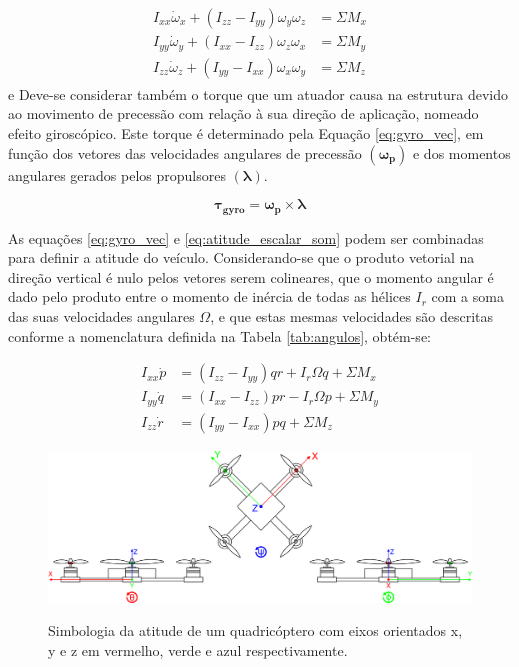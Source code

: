 \documentclass[main.tex]{subfiles}
\begin{document}
\begin{align}\label{eq:revisao_coriolis_escalar}
    \begin{split}
        I_{xx}\dot{\omega}_{x} + (I_{zz} - I_{yy})\omega_y\omega_z &= \Sigma M_x\\
        I_{yy}\dot{\omega}_{y} + (I_{xx} - I_{zz})\omega_z\omega_x &= \Sigma M_y\\
        I_{zz}\dot{\omega}_{z} + (I_{yy} - I_{xx})\omega_x\omega_y &= \Sigma M_z
    \end{split}
\end{align}
e
Deve-se considerar também o torque que um atuador causa na estrutura devido ao movimento de precessão com relação à sua direção de aplicação, nomeado efeito giroscópico. Este torque é determinado pela Equação \ref{eq:gyro_vec}, em função dos vetores das velocidades angulares de precessão $(\boldsymbol{\omega_p})$ e dos momentos angulares gerados pelos propulsores $(\boldsymbol{\lambda})$.

\begin{equation}\label{eq:gyro_vec}
    \boldsymbol{\tau_{gyro}} = \boldsymbol{\omega_p}\times\boldsymbol{\lambda}
\end{equation}

As equações \ref{eq:gyro_vec} e \ref{eq:atitude_escalar_som} podem ser combinadas para definir a atitude do veículo. Considerando-se que o produto vetorial na direção vertical é nulo pelos vetores serem colineares, que o momento angular é dado pelo produto entre o momento de inércia de todas as hélices $I_r$ com a soma das suas velocidades angulares $\Omega$, e que estas mesmas velocidades são descritas conforme a nomenclatura definida na Tabela \ref{tab:angulos}, obtém-se:

\begin{equation}\label{eq:atitude_escalar_som}
    \begin{split}
        I_{xx}\dot{p} &= (I_{zz} - I_{yy})qr + I_r\Omega q + \Sigma M_x\\
        I_{yy}\dot{q} &= (I_{xx} - I_{zz})pr - I_r\Omega p + \Sigma M_y\\
        I_{zz}\dot{r} &= (I_{yy} - I_{xx})pq + \Sigma M_z
    \end{split}
\end{equation}

\begin{figure}[!h]
    \centering
    \caption{Simbologia da atitude de um quadricóptero com eixos orientados x, y e z em vermelho, verde e azul respectivamente.}
    \includegraphics[width=1\textwidth]{capitulos/modelagem/imgs/drone_orientation.png}
    \label{fig:drone_orientations}
\end{figure}
\end{document}
